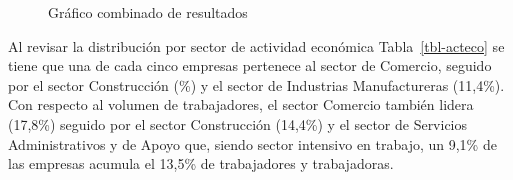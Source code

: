 \documentclass[
  14pt,
]{article}
\begin{document}
\FloatBarrier

\begin{figure}[H]

\caption{\label{fig-combined}Gráfico combinado de resultados}


\end{figure}%

\FloatBarrier

Al revisar la distribución por sector de actividad económica
Tabla~\ref{tbl-acteco} se tiene que una de cada cinco empresas pertenece
al sector de Comercio, seguido por el sector Construcción
(\%) y el sector de Industrias Manufactureras (11,4\%). Con
respecto al volumen de trabajadores, el sector Comercio también lidera
(17,8\%) seguido por el sector Construcción (14,4\%) y el sector de
Servicios Administrativos y de Apoyo que, siendo sector intensivo en
trabajo, un 9,1\% de las empresas acumula el 13,5\% de trabajadores y
trabajadoras.

\FloatBarrier
\end{document}
